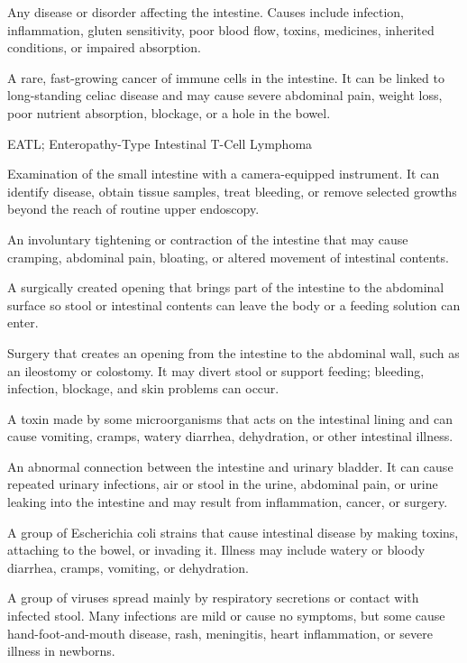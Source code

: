  Any disease or disorder affecting the intestine. Causes include infection, inflammation, gluten sensitivity, poor blood flow, toxins, medicines, inherited conditions, or impaired absorption.

 A rare, fast-growing cancer of immune cells in the intestine. It can be linked to long-standing celiac disease and may cause severe abdominal pain, weight loss, poor nutrient absorption, blockage, or a hole in the bowel.

\synonyms
EATL; Enteropathy-Type Intestinal T-Cell Lymphoma

 Examination of the small intestine with a camera-equipped instrument. It can identify disease, obtain tissue samples, treat bleeding, or remove selected growths beyond the reach of routine upper endoscopy.

 An involuntary tightening or contraction of the intestine that may cause cramping, abdominal pain, bloating, or altered movement of intestinal contents.

 A surgically created opening that brings part of the intestine to the abdominal surface so stool or intestinal contents can leave the body or a feeding solution can enter.

 Surgery that creates an opening from the intestine to the abdominal wall, such as an ileostomy or colostomy. It may divert stool or support feeding; bleeding, infection, blockage, and skin problems can occur.

 A toxin made by some microorganisms that acts on the intestinal lining and can cause vomiting, cramps, watery diarrhea, dehydration, or other intestinal illness.

 An abnormal connection between the intestine and urinary bladder. It can cause repeated urinary infections, air or stool in the urine, abdominal pain, or urine leaking into the intestine and may result from inflammation, cancer, or surgery.

 A group of Escherichia coli strains that cause intestinal disease by making toxins, attaching to the bowel, or invading it. Illness may include watery or bloody diarrhea, cramps, vomiting, or dehydration.

 A group of viruses spread mainly by respiratory secretions or contact with infected stool. Many infections are mild or cause no symptoms, but some cause hand-foot-and-mouth disease, rash, meningitis, heart inflammation, or severe illness in newborns.

